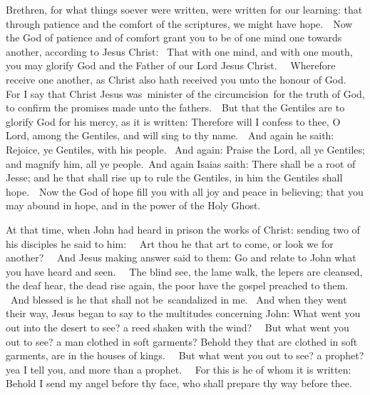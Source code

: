 Brethren, for what things soever were written, were written for our learning: that
through patience and the comfort of the scriptures, we might have hope.  Now
the God of patience and of comfort grant you to be of one mind one towards
another, according to Jesus Christ:  That with one mind, and with one mouth,
you may glorify God and the Father of our Lord Jesus Christ.   Wherefore
receive one another, as Christ also hath received you unto the honour of God.  
For I say that Christ Jesus was minister of the circumcision for the truth of God, to confirm the
promises made unto the fathers.  But that the Gentiles are to glorify God for
his mercy, as it is written: Therefore will I confess to thee, O Lord, among
the Gentiles, and will sing to thy name.  And again he saith: Rejoice, ye
Gentiles, with his people.   And again: Praise the Lord, all ye Gentiles; and
magnify him, all ye people. And again Isaias saith: There shall be a root of
Jesse; and he that shall rise up to rule the Gentiles, in him the Gentiles
shall hope.  Now the God of hope fill you with all joy and peace in believing;
that you may abound in hope, and in the power of the Holy Ghost. 

\medskip


At that time, when John had heard in prison the works of Christ: sending two of his
disciples he said to him:   Art thou he that art to come, or look we for
another?   And Jesus making answer said to them: Go and relate to John what you
have heard and seen.   The blind see, the lame walk, the lepers are cleansed,
the deaf hear, the dead rise again, the poor have the gospel preached to them.
 And blessed is he that shall not be scandalized in me.  And
when they went their way, Jesus began to say to the multitudes concerning John:
What went you out into the desert to see? a reed shaken with the wind?   But
what went you out to see? a man clothed in soft garments?  Behold they that are
clothed in soft garments, are in the houses of kings.   But what went you out
to see? a prophet? yea I tell you, and more than a prophet.   For this is he of
whom it is written: Behold I send my angel before thy face, who shall prepare
thy way before thee.

